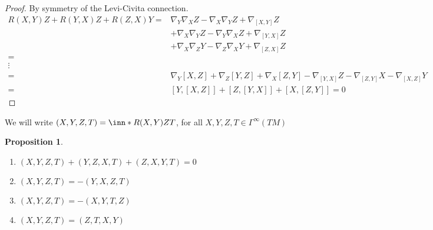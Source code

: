 \documentclass[a4paper]{article}
\newtheorem*{prop}{Proposition}
\begin{document}
 \begin{proof}
   By symmetry of the Levi-Civita connection. 
   \[
     \begin{aligned}
       R(X,Y)Z + R(Y,X)Z + R(Z,X)Y =& \nabla_Y \nabla_X Z - \nabla_X \nabla_Y Z + \nabla_{[X,Y]} Z \\
                                    &+ \nabla_X \nabla_Y Z - \nabla_Y \nabla_X Z + \nabla_{[Y,X]} Z\\
                                    &+ \nabla_X \nabla_Z Y - \nabla_Z \nabla_X Y + \nabla_{[Z,X]} Z\\
       =& \\
                                    \vdots \\
       =& \nabla_Y[X,Z] + \nabla_Z [Y,Z] + \nabla_X[Z,Y] - \nabla_{[Y,X]}Z  - \nabla_{[Z,Y]}X - \nabla_{[X,Z]}Y \\
       =& [Y,[X,Z]] + [Z,[Y,X]] + [X,[Z,Y]] = 0
     \end{aligned}
   \]
 \end{proof}
 We will write $(X,Y,Z,T) = \inn*{R(X,Y)Z}{T}$, for all $X,Y,Z,T \in \Gamma^{\infty}(TM)$

 \begin{prop}
   \begin{enumerate}
     \item $(X,Y,Z,T) + (Y,Z,X,T) + (Z,X,Y,T) = 0$ 
     \item $(X,Y,Z,T) = -(Y,X,Z,T)$
     \item $(X,Y,Z,T) = -(X,Y,T,Z)$
     \item $(X,Y,Z,T) = (Z,T,X,Y)$
   \end{enumerate}
 \end{prop}
\end{document}
